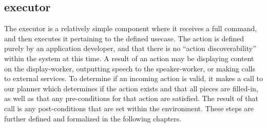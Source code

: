 \subsection{executor}

The executor is a relatively simple component where it receives a full command,
and then executes it pertaining to the defined usecase. The action is defined purely
by an application developer, and that there is no ``action discoverability'' within
the system at this time. A result of an action may be displaying content on the
display-worker, outputting speech to the speaker-worker, or making calls to external
services. To determine if an incoming action is valid, it makes a call to our planner
which determines if the action exists and that all pieces are filled-in, as well as that
any pre-conditions for that action are satisfied. The result of that call is any
post-conditions that are set within the environment. These steps are further defined
and formalized in the following chapters.
